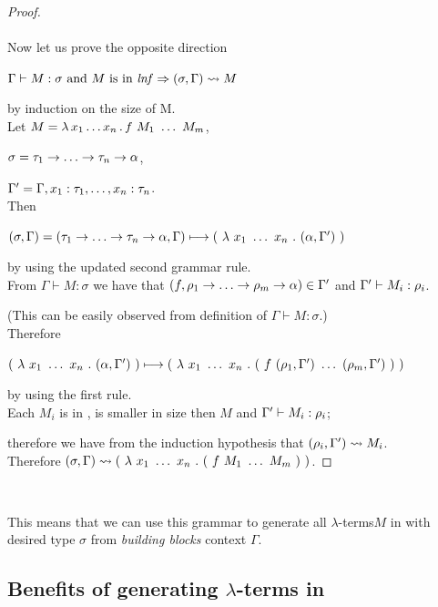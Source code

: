 \documentclass[12pt,a4paper]{report}
\newcommand{\lets}{let us\xspace}
\newcommand{\lterms}{$\lambda$-terms\xspace}
\newcommand{\tur}[3]{#1\vdash{}#2:#3}
\newcommand{\turst}[3]{$#1\vdash{}#2:#3$\xspace}
\newcommand{\GMS}{\turst{\Gamma}{M}{\sigma}}
\begin{document}
\begin{proof}
~\\~\\

Now \lets prove the opposite direction 

$\tur{\Gamma}{M}{\sigma} \text{ and $M$ is in \textit{lnf}}
\then
(\sigma,\Gamma) \garr M$
   
by induction on the size of M.\\


Let $M = \lambda \, x_1 \dots x_n \, . \, f~M_1~\dots~M_m$,

$\sigma = \tau_1 \ar \dots \ar \tau_n \ar \alpha$,

$\Gamma^\prime = \Gamma , x_1:\tau_1 , \dots , x_n:\tau_n$.\\

Then

$
( \sigma , \Gamma ) =
( \tau_1 \ar \dots \ar \tau_n \ar \alpha , \Gamma )  
\gar
(~\lambda~x_1~\dots~x_n~.~
( \alpha , \Gp )~)
$

by using the updated second grammar rule.\\

From \GMS we have that $(f,\rho_1\ar\dots\ar\rho_m\ar\alpha) \in \Gp$
and $\tur{\Gp}{M_i}{\rho_i}$.

(This can be easily observed from definition of \GMS.)\\

Therefore 

$
(~\lambda~x_1~\dots~x_n~.~( \alpha , \Gamma^\prime )~)
\longmapsto
(~\lambda~x_1~\dots~x_n~.~
	(~f~( \rho_1 , \Gamma^\prime )~\dots~( \rho_m , \Gamma^\prime )~)
~)
$

by using the first rule.\\

Each $M_i$ is in \lnf, 
is smaller in size then $M$
and $\tur{\Gp}{M_i}{\rho_i}$; 

therefore we have from the induction hypothesis that 
$(\rho_i,\Gamma^\prime) \leadsto M_i$.\\

Therefore 
$
( \sigma , \Gamma )
\leadsto
(~\lambda~x_1~\dots~x_n~.~
	(~f~M_1~\dots~M_m~)
~)
$.
 
\end{proof}~


This means that we can use this grammar to generate all \lterms $M$ in \lnf
with desired type $\sigma$ from \textit{building blocks} context $\Gamma$.\\



\subsection{Benefits of generating \lterms in \lnf}
\end{document}
